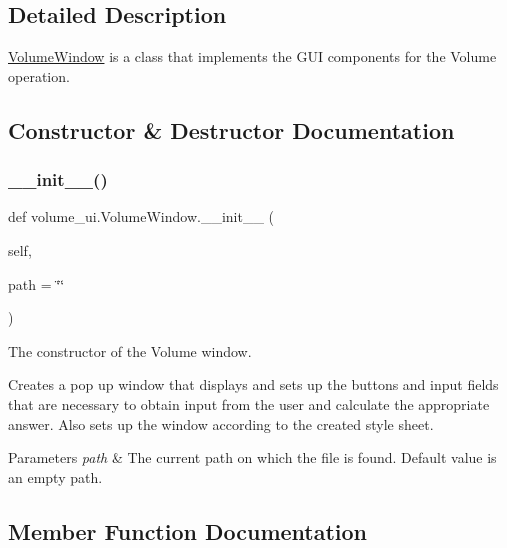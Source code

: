 \subsection{Detailed Description}
\hyperlink{classvolume__ui_1_1_volume_window}{Volume\+Window} is a class that implements the G\+UI components for the Volume operation. 

\subsection{Constructor \& Destructor Documentation}
\mbox{\label{classvolume__ui_1_1_volume_window_ab2ab926742b93b5fc0030332e60d4bc7}} 
\subsubsection{\texorpdfstring{\+\_\+\+\_\+init\+\_\+\+\_\+()}{\_\_init\_\_()}}
{\footnotesize\ttfamily def volume\+\_\+ui.\+Volume\+Window.\+\_\+\+\_\+init\+\_\+\+\_\+ (\begin{DoxyParamCaption}\item[{}]{self,  }\item[{}]{path = {\ttfamily \char`\"{}\char`\"{}} }\end{DoxyParamCaption})}



The constructor of the Volume window. 

Creates a pop up window that displays and sets up the buttons and input fields that are necessary to obtain input from the user and calculate the appropriate answer. Also sets up the window according to the created style sheet. 
\begin{DoxyParams}{Parameters}
{\em path} & The current path on which the file is found. Default value is an empty path. \\
\hline
\end{DoxyParams}


\subsection{Member Function Documentation}
\mbox{\label{classvolume__ui_1_1_volume_window_a1b4cb7b0bd52c5898a39dbfb81e5cb85}} 
